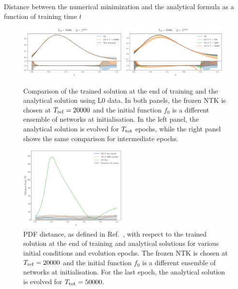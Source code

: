 Distance between the numerical minimization and the analytical formula as a
function of training time $t$



\newpage


\begin{figure}[ht!]
    \centering
    \includegraphics[width=0.48\textwidth]{plots/analytical_solution/pdf_plot_init_last_epoch_L0.pdf}
    \includegraphics[width=0.48\textwidth]{plots/analytical_solution/pdf_plot_init_epochs_L0.pdf}
    \caption{Comparison of the trained solution at the end of training and
    the analytical solution using L0 data. In both panels, the
    frozen NTK is chosen at $T_{\rm ref} = 20000$ and the initial function $f_0$
    is a different ensemble of networks at initialisation. In the left panel,
    the analytical solution is evolved for $T_{\rm tot}$ epochs, while the right
    panel shows the same comparison for intermediate epochs.}
    \label{fig:xT3_analytical_init_L0}
  \end{figure}
  \begin{figure}[ht!]
    \centering
    \includegraphics[width=0.48\textwidth]{plots/analytical_solution/distance_plot_L0.pdf}
    \caption{PDF distance, as defined in Ref.~\cite{NNPDF:2021njg}, with respect to
    the trained solution at the end of training and analytical
    solutions for various initial conditions and evolution epochs. The frozen NTK
    is chosen at $T_{\rm ref} = 20000$ and the initial function $f_0$ is a different
    ensemble of networks at initialisation. For the last epoch, the analytical solution
    is evolved for $T_{\rm tot} = 50000$.}
    \label{fig:xT3_distance_L0}
  \end{figure}


